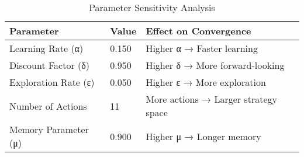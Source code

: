 \begin{table}[htbp]
\centering
\caption{Parameter Sensitivity Analysis}
\label{tab:parameters}
\begin{tabular}{lll}
\toprule
Parameter & Value & Effect on Convergence \\
\midrule
Learning Rate (α) & 0.150 & Higher α → Faster learning \\
Discount Factor (δ) & 0.950 & Higher δ → More forward-looking \\
Exploration Rate (ε) & 0.050 & Higher ε → More exploration \\
Number of Actions & 11 & More actions → Larger strategy space \\
Memory Parameter (μ) & 0.900 & Higher μ → Longer memory \\
\bottomrule
\end{tabular}
\end{table}